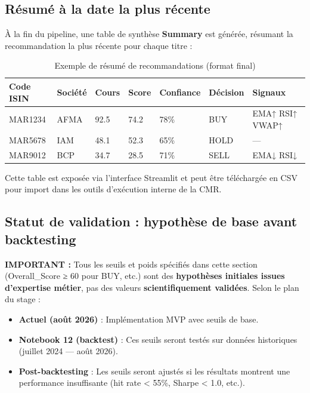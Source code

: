 \documentclass{rapportENSIAS} %
\begin{document}
\subsection{Résumé à la date la plus récente}

\noindent
À la fin du pipeline, une table de synthèse \textbf{Summary} est générée, résumant la recommandation la plus récente pour chaque titre :

\begin{table}[H]
\centering
\small
\begin{tabular}{lllllll}
\toprule
\textbf{Code ISIN} & \textbf{Société} & \textbf{Cours} & \textbf{Score} & \textbf{Confiance} & \textbf{Décision} & \textbf{Signaux} \\
\midrule
MAR1234 & AFMA & 92.5 & 74.2 & 78\% & BUY & EMA↑ RSI↑ VWAP↑ \\
MAR5678 & IAM & 48.1 & 52.3 & 65\% & HOLD & — \\
MAR9012 & BCP & 34.7 & 28.5 & 71\% & SELL & EMA↓ RSI↓ \\
\bottomrule
\end{tabular}
\caption{Exemple de résumé de recommandations (format final)}
\label{tab:summary-example}
\end{table}

\noindent
Cette table est exposée via l'interface Streamlit et peut être téléchargée en CSV pour import dans les outils d'exécution interne de la CMR.

\subsection{Statut de validation : hypothèse de base avant backtesting}

\noindent
\textbf{IMPORTANT :} Tous les seuils et poids spécifiés dans cette section (Overall\_Score ≥ 60 pour BUY, etc.) sont des \textbf{hypothèses initiales issues d'expertise métier}, pas des valeurs \textbf{scientifiquement validées}. Selon le plan du stage :

\begin{itemize}
    \item \textbf{Actuel (août 2026)} : Implémentation MVP avec seuils de base.
    \item \textbf{Notebook 12 (backtest)} : Ces seuils seront testés sur données historiques (juillet 2024 — août 2026).
    \item \textbf{Post-backtesting} : Les seuils seront ajustés si les résultats montrent une performance insuffisante (hit rate < 55\%, Sharpe < 1.0, etc.).
\end{itemize}
\end{document}
